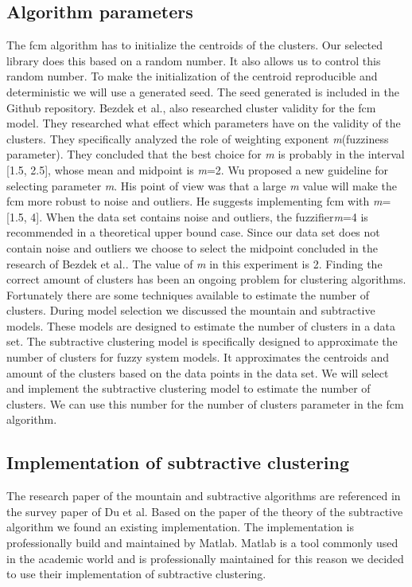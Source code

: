 \documentclass[../../main]{subfiles}
\begin{document}
\subsection{Algorithm parameters}
The \acrshort{fcm} algorithm has to initialize the centroids of the clusters.
Our selected library does this based on a random number.
It also allows us to control this random number.
To make the initialization of the centroid reproducible and deterministic we will use a generated seed.
The seed generated is included in the Github repository\cite{rbasarat-repo}.
\newline
Bezdek et al., also researched cluster validity for the \acrshort{fcm} model\cite{Bezdek1995OnModel}.
They researched what effect which parameters have on the validity of the clusters.
They specifically analyzed the role of weighting exponent \textit{m}(fuzziness parameter).
They concluded that the best choice for \textit{m} is probably in the interval [1.5, 2.5], whose mean and midpoint is \textit{m}=2.
Wu proposed a new guideline for selecting parameter \textit{m}\cite{Wu2012}.
His point of view was that a large \textit{m} value will make the \acrlong{fcm} more robust to noise and outliers.
He suggests implementing \acrlong{fcm} with \textit{m}=[1.5, 4].
When the data set contains noise and outliers, the fuzzifier\textit{m}=4 is recommended in a theoretical upper bound case.
Since our data set does not contain noise and outliers we choose to select the midpoint concluded in the research of Bezdek et al.\cite{Bezdek1995OnModel}.
The value of \textit{m} in this experiment is 2.
\newline
Finding the correct amount of clusters has been an ongoing problem for clustering algorithms\cite{Du2010Clustering:Approach}.
Fortunately there are some techniques available to estimate the number of clusters.
During model selection we discussed the mountain and subtractive models. 
These models are designed to estimate the number of clusters in a data set.
The subtractive clustering model is specifically designed to approximate the number of clusters for fuzzy system models\cite{Chiu1994FuzzyEstimation}.
It approximates the centroids and amount of the clusters based on the data points in the data set\cite{Chiu1994FuzzyEstimation}.
We will select and implement the subtractive clustering model to estimate the number of clusters.
We can use this number for the number of clusters parameter in the \acrshort{fcm} algorithm.

\subsection{Implementation of subtractive clustering}
The research paper of the mountain and subtractive algorithms are referenced in the survey paper of Du et al\cite{Du2010Clustering:Approach}.
Based on the paper of the theory of the subtractive algorithm\cite{Chiu1994FuzzyEstimation} we found an existing implementation\cite{matlabSubtractive}.
The implementation is professionally build and maintained by Matlab\cite{matlabSubtractive}.
Matlab is a tool commonly used in the academic world and is professionally maintained for this reason we decided to use their implementation of subtractive clustering.
\end{document}
